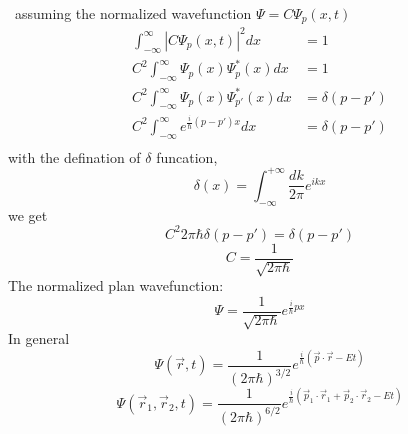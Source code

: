 \begin{frame}[allowframebreaks=]  
    \Solution  ~assuming the normalized wavefunction 
    $\Psi=C\Psi_p (x,t)$
    \begin{equation*}
        \begin{split}
            \int_{-\infty} ^\infty |C\Psi_p (x,t)|^2 dx &=1  \\
            C^2 \int_{-\infty} ^\infty \Psi_p (x) \Psi_{p} ^* (x) dx &=1  \\
            C^2 \int_{-\infty} ^\infty \Psi_p (x) \Psi_{p'} ^* (x) dx &=\delta (p-p')  \\
            C^2 \int_{-\infty} ^\infty e^{\frac{i}{\hbar}(p-p')x} dx &=\delta (p-p')\\
        \end{split} 
     \end{equation*}
     with the defination of $\delta$ funcation,
     \[ \delta(x)=\int_{-\infty}^{+\infty} \frac{d k}{2 \pi} e^{i k x}\]
     we get
     \[C^2 2\pi \hbar \delta (p-p') =\delta(p-p') \]
     \[C= \dfrac{1}{\sqrt{2\pi \hbar}}\]
     The normalized plan wavefunction:
     \begin{equation*}
        \Psi=\frac{1}{\sqrt{2\pi \hbar}} e^{\frac{i}{\hbar}px}
    \end{equation*}  
    In general
    \[ \Psi(\vec r ,t)=\frac{1}{(2\pi \hbar)^{3/2}} e^{\frac{i}{\hbar}(\vec p\cdot \vec r -Et)} \]
    \[ \Psi(\vec r_1 ,\vec r_2, t)=\frac{1}{(2\pi \hbar)^{6/2}} e^{\frac{i}{\hbar}(\vec p_1 \cdot \vec r_1 +\vec p_2 \cdot \vec r_2 -Et)} \]
\end{frame}

